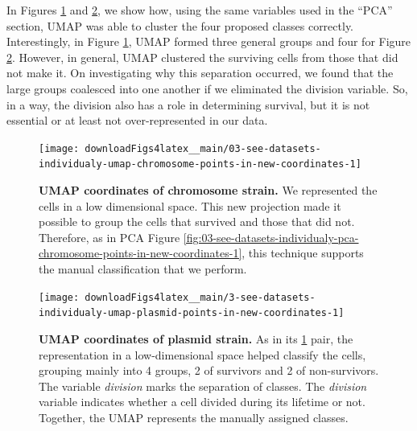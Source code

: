 \documentclass[a4paper, nobind]{templates/ociamthesis}
\begin{document}
In Figures \ref{fig:03-see-datasets-individualy-umap-chromosome-points-in-new-coordinates-1} and \ref{fig:3-see-datasets-individualy-umap-plasmid-points-in-new-coordinates-1}, we show how, using the same variables used in the ``PCA'' section, UMAP was able to cluster the four proposed classes correctly.
Interestingly, in Figure \ref{fig:03-see-datasets-individualy-umap-chromosome-points-in-new-coordinates-1}, UMAP formed three general groups and four for Figure \ref{fig:3-see-datasets-individualy-umap-plasmid-points-in-new-coordinates-1}.
However, in general, UMAP clustered the surviving cells from those that did not make it.
On investigating why this separation occurred, we found that the large groups coalesced into one another if we eliminated the division variable.
So, in a way, the division also has a role in determining survival, but it is not essential or at least not over-represented in our data.





\begin{figure}[H]
\texttt{[image: downloadFigs4latex\_\_main/03-see-datasets-individualy-umap-chromosome-points-in-new-coordinates-1]} \caption[UMAP coordinates of chromosome strain.]{\textbf{UMAP coordinates of chromosome strain.} We represented the cells in a low dimensional space. This new projection made it possible to group the cells that survived and those that did not. Therefore, as in PCA Figure \ref{fig:03-see-datasets-individualy-pca-chromosome-points-in-new-coordinates-1}, this technique supports the manual classification that we perform.}\label{fig:03-see-datasets-individualy-umap-chromosome-points-in-new-coordinates-1}
\end{figure}





\begin{figure}[H]
\texttt{[image: downloadFigs4latex\_\_main/3-see-datasets-individualy-umap-plasmid-points-in-new-coordinates-1]} \caption[UMAP coordinates of plasmid strain.]{\textbf{UMAP coordinates of plasmid strain.} As in its \ref{fig:03-see-datasets-individualy-umap-chromosome-points-in-new-coordinates-1} pair, the representation in a low-dimensional space helped classify the cells, grouping mainly into 4 groups, 2 of survivors and 2 of non-survivors. The variable \emph{division} marks the separation of classes. The \emph{division} variable indicates whether a cell divided during its lifetime or not. Together, the UMAP represents the manually assigned classes.}\label{fig:3-see-datasets-individualy-umap-plasmid-points-in-new-coordinates-1}
\end{figure}
\end{document}
